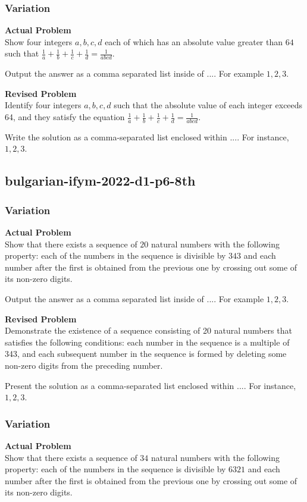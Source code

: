 \subsubsection{Variation}
\textbf{Actual Problem}\\
Show four integers $a, b, c, d$ each of which has an absolute value greater than $64$ such that $\frac{1}{a} + \frac{1}{b} + \frac{1}{c} + \frac{1}{d} = \frac{1}{abcd}$.

Output the answer as a comma separated list inside of $\boxed{...}$. For example $\boxed{1, 2, 3}$.

\textbf{Revised Problem}\\
Identify four integers \(a, b, c, d\) such that the absolute value of each integer exceeds 64, and they satisfy the equation \(\frac{1}{a} + \frac{1}{b} + \frac{1}{c} + \frac{1}{d} = \frac{1}{abcd}\).

Write the solution as a comma-separated list enclosed within \(\boxed{...}\). For instance, \(\boxed{1, 2, 3}\).

\subsection{bulgarian-ifym-2022-d1-p6-8th}
\subsubsection{Variation}
\textbf{Actual Problem}\\
Show that there exists a sequence of $20$ natural numbers with the following property: each of the numbers in the sequence is divisible by $343$ and each number after the first is obtained from the previous one by crossing out some of its non-zero digits.

Output the answer as a comma separated list inside of $\boxed{...}$. For example $\boxed{1, 2, 3}$.

\textbf{Revised Problem}\\
Demonstrate the existence of a sequence consisting of 20 natural numbers that satisfies the following conditions: each number in the sequence is a multiple of 343, and each subsequent number in the sequence is formed by deleting some non-zero digits from the preceding number.

Present the solution as a comma-separated list enclosed within $\boxed{...}$. For instance, $\boxed{1, 2, 3}$.

\subsubsection{Variation}
\textbf{Actual Problem}\\
Show that there exists a sequence of $34$ natural numbers with the following property: each of the numbers in the sequence is divisible by $6321$ and each number after the first is obtained from the previous one by crossing out some of its non-zero digits.

